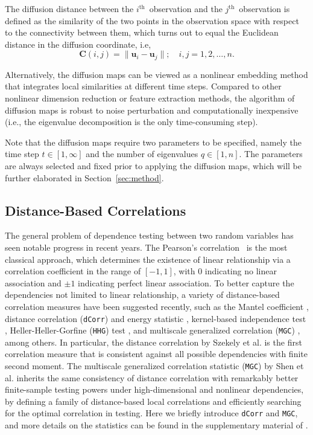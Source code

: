 \documentclass[11pt]{article}
\theoremstyle{definition}
\begin{document}
The diffusion distance between the $i^{\mbox{th}}$~observation and the $j^{\mbox{th}}$~observation is defined as the similarity of the two points in the observation space with respect to the connectivity between them, which turns out to equal the Euclidean distance in the diffusion coordinate, i.e,
\begin{equation}
\label{eq:diffusion}
\mathbf{C}(i,j)  =   \| \mathbf{u}_i - \mathbf{u}_j \|; \quad i,j = 1,2, \ldots , n.
\end{equation}

Alternatively, the diffusion maps can be viewed as a nonlinear embedding method that integrates local similarities at different time steps. Compared to other nonlinear dimension reduction or feature extraction methods, the algorithm of diffusion maps is robust to noise perturbation and computationally inexpensive (i.e., the eigenvalue decomposition is the only time-consuming step). 

Note that the diffusion maps require two parameters to be specified, namely the time step $t \in [1,\infty]$ and the number of eigenvalues $q \in [1,n]$. The parameters are always selected and fixed prior to applying the diffusion maps, which will be further elaborated in Section~\ref{sec:method}. 

\subsection{Distance-Based Correlations}
\label{ssec:method1}

The general problem of dependence testing between two random variables has seen notable progress in recent years. The Pearson's correlation~\cite{Pearson1895} is the most classical approach, which determines the existence of linear relationship via a correlation coefficient in the range of $[-1,1]$, with $0$ indicating no linear association and $\pm 1$ indicating perfect linear association. To better capture the dependencies not limited to linear relationship, a variety of distance-based correlation measures have been suggested recently, such as the Mantel coefficient \cite{mantel1967}, distance correlation (\texttt{dCorr}) and energy statistic \cite{szekely2007measuring,szekelyRizzo2013a, RizzoSzekely2016}, kernel-based independence test \cite{GrettonGyorfi2010}, Heller-Heller-Gorfine (\texttt{HHG}) test \cite{HellerGorfine2013,heller2016consistent}, and multiscale generalized correlation (\texttt{MGC}) \cite{shen2016discovering}, among others. In particular, the distance correlation by Szekely et al. \cite{szekely2007measuring} is the first correlation measure that is consistent against all possible dependencies with finite second moment. The multiscale generalized correlation statistic (\texttt{MGC}) by Shen et al. \cite{shen2016discovering} inherits the same consistency of distance correlation with remarkably better finite-sample testing powers under high-dimensional and nonlinear dependencies, by defining a family of distance-based local correlations and efficiently searching for the optimal correlation in testing. Here we briefly introduce \texttt{dCorr} and \texttt{MGC}, and more details on the statistics can be found in the supplementary material of \cite{shen2016discovering}. 
\end{document}
